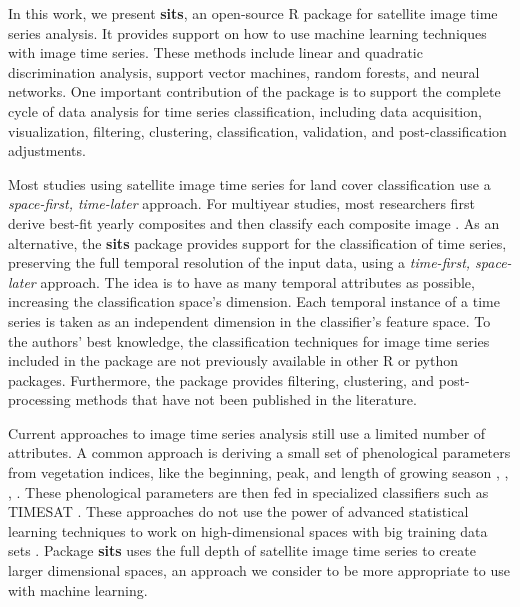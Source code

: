 \documentclass[a4paper,]{tufte-book}
\begin{document}
In this work, we present \textbf{sits}, an open-source R package for satellite image time series analysis. It provides support on how to use machine learning techniques with image time series. These methods include linear and quadratic discrimination analysis, support vector machines, random forests, and neural networks. One important contribution of the package is to support the complete cycle of data analysis for time series classification, including data acquisition, visualization, filtering, clustering, classification, validation, and post-classification adjustments.

Most studies using satellite image time series for land cover classification use a \emph{space-first, time-later} approach. For multiyear studies, most researchers first derive best-fit yearly composites and then classify each composite image \citep{Gomez2016}. As an alternative, the \textbf{sits} package provides support for the classification of time series, preserving the full temporal resolution of the input data, using a \emph{time-first, space-later} approach. The idea is to have as many temporal attributes as possible, increasing the classification space's dimension. Each temporal instance of a time series is taken as an independent dimension in the classifier's feature space. To the authors' best knowledge, the classification techniques for image time series included in the package are not previously available in other R or python packages. Furthermore, the package provides filtering, clustering, and post-processing methods that have not been published in the literature.

Current approaches to image time series analysis still use a limited number of attributes. A common approach is deriving a small set of phenological parameters from vegetation indices, like the beginning, peak, and length of growing season \citep{Brown2013}, \citep{Kastens2017}, \citep{Estel2015}, \citep{Pelletier2016}. These phenological parameters are then fed in specialized classifiers such as TIMESAT \citep{Jonsson2004}. These approaches do not use the power of advanced statistical learning techniques to work on high-dimensional spaces with big training data sets \citep{James2013}. Package \textbf{sits} uses the full depth of satellite image time series to create larger dimensional spaces, an approach we consider to be more appropriate to use with machine learning.
\end{document}
